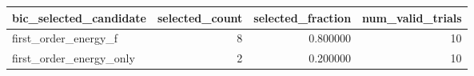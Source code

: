 \begin{tabular}{lrrr}
\toprule
bic_selected_candidate & selected_count & selected_fraction & num_valid_trials \\
\midrule
first_order_energy_f & 8 & 0.800000 & 10 \\
first_order_energy_only & 2 & 0.200000 & 10 \\
\bottomrule
\end{tabular}

